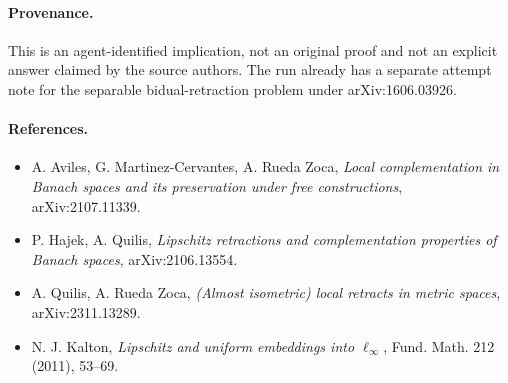 \documentclass[11pt]{article}
\begin{document}
\paragraph{Provenance.}
This is an agent-identified implication, not an original proof and not an
explicit answer claimed by the source authors.  The run already has a separate
attempt note for the separable bidual-retraction problem under arXiv:1606.03926.

\paragraph{References.}
\begin{itemize}
  \item A. Aviles, G. Martinez-Cervantes, A. Rueda Zoca,
  \emph{Local complementation in Banach spaces and its preservation under free
  constructions}, arXiv:2107.11339.
  \item P. Hajek, A. Quilis, \emph{Lipschitz retractions and complementation
  properties of Banach spaces}, arXiv:2106.13554.
  \item A. Quilis, A. Rueda Zoca, \emph{(Almost isometric) local retracts in
  metric spaces}, arXiv:2311.13289.
  \item N. J. Kalton, \emph{Lipschitz and uniform embeddings into
  \(\ell_\infty\)}, Fund. Math. 212 (2011), 53--69.
\end{itemize}
\end{document}
